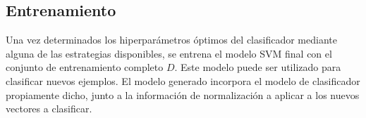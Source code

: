 %
%
\subsection{Entrenamiento}
%
Una vez determinados los hiperparámetros óptimos del clasificador
mediante alguna de las estrategias disponibles, se entrena el modelo
SVM final con el conjunto de entrenamiento completo $D$.
Este modelo puede ser utilizado para clasificar nuevos ejemplos.
El modelo generado incorpora el modelo de clasificador propiamente
dicho, junto a la información de normalización a aplicar a los nuevos
vectores a clasificar.

